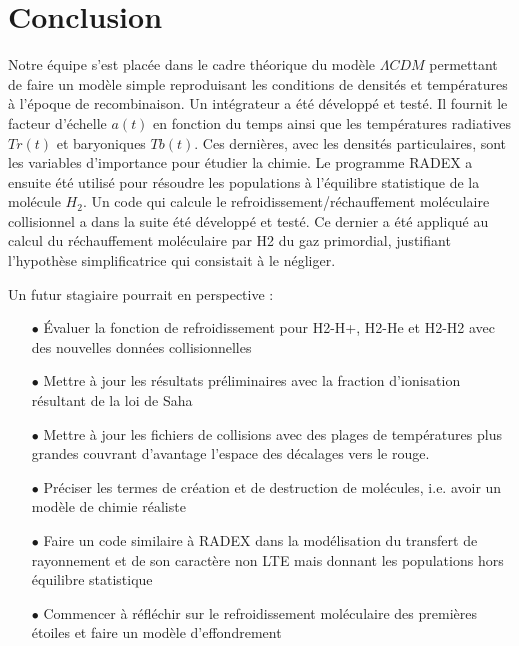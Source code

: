 \documentclass[10pt, a4paper]{report}
\numberwithin{equation}{subsection}
\begin{document}


\section*{Conclusion}
Notre équipe s'est placée dans le cadre théorique du modèle $\Lambda CDM$ permettant de faire un modèle simple reproduisant les conditions de densités et températures à l'époque de recombinaison. Un intégrateur a été développé et testé. Il fournit le facteur d'échelle $a(t)$ en fonction du temps ainsi que les températures radiatives $Tr(t)$ et baryoniques $Tb(t)$. Ces dernières, avec les densités particulaires, sont les variables d'importance pour étudier la chimie. Le programme RADEX a ensuite été utilisé pour résoudre les populations à l'équilibre statistique de la molécule $H_2$. Un code qui calcule le refroidissement/réchauffement moléculaire collisionnel a dans la suite été développé et testé. Ce dernier a été appliqué au calcul du réchauffement moléculaire par H2 du gaz primordial, justifiant l'hypothèse simplificatrice qui consistait à le négliger.

Un futur stagiaire pourrait en perspective :
\begin{itemize}
	\item [$\bullet$]\uppercase{é}valuer la fonction de refroidissement pour H2-H+, H2-He et H2-H2 avec des nouvelles données collisionnelles
	\item [$\bullet$] Mettre à jour les résultats préliminaires avec la fraction d'ionisation résultant de la loi de Saha
	\item [$\bullet$] Mettre à jour les fichiers de collisions avec des plages de températures plus grandes couvrant d'avantage l'espace des décalages vers le rouge.
	\item [$\bullet$] Préciser les termes de création et de destruction de molécules, i.e. avoir un modèle de chimie réaliste
	\item [$\bullet$] Faire un code similaire à RADEX dans la modélisation du transfert de rayonnement et de son caractère non LTE mais donnant les populations hors équilibre statistique
	\item [$\bullet$] Commencer à réfléchir sur le refroidissement moléculaire des premières étoiles et faire un modèle d'effondrement
\end{itemize}
\appendix
\end{document}

